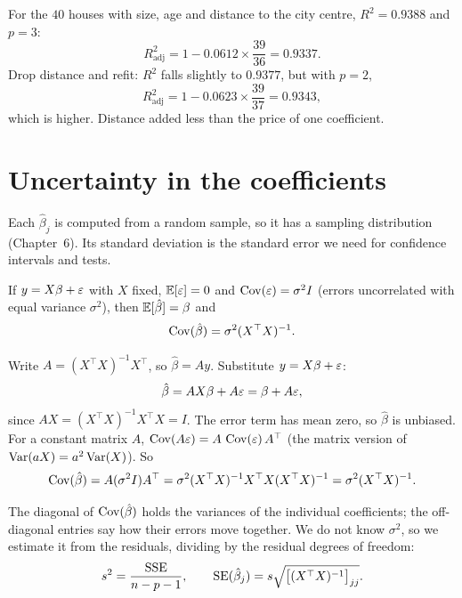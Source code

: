 For the $40$ houses with size, age and distance to the city centre, $R^2 = 0.9388$ and
$p = 3$:
\[
  R^2_{\text{adj}} = 1 - 0.0612\times\frac{39}{36} = 0.9337 .
\]
Drop distance and refit: $R^2$ falls slightly to $0.9377$, but with $p = 2$,
\[
  R^2_{\text{adj}} = 1 - 0.0623\times\frac{39}{37} = 0.9343,
\]
which is higher. Distance added less than the price of one coefficient.

\section{Uncertainty in the coefficients}
\label{sec:mlr-se}

Each $\hat\beta_j$ is computed from a random sample, so it has a sampling distribution
(Chapter~6). Its standard deviation is the standard error we need for confidence
intervals and tests.

\begin{theorem}
If $y = X\beta + \varepsilon$ with $X$ fixed, $\operatorname{\mathbb{E}}[\varepsilon] = 0$ and $\operatorname{Cov}(\varepsilon) = \sigma^2 I$
(errors uncorrelated with equal variance $\sigma^2$), then $\operatorname{\mathbb{E}}[\hat\beta] = \beta$ and
\[
  \operatorname{Cov}(\hat\beta) = \sigma^2 (X^\top X)^{-1}.
\]
\end{theorem}

\begin{whybox}
Write $A = (X^\top X)^{-1}X^\top$, so $\hat\beta = Ay$. Substitute $y = X\beta + \varepsilon$:
\[
  \hat\beta = AX\beta + A\varepsilon = \beta + A\varepsilon,
\]
since $AX = (X^\top X)^{-1}X^\top X = I$. The error term has mean zero, so $\hat\beta$
is unbiased. For a constant matrix $A$, $\operatorname{Cov}(A\varepsilon) = A\,\operatorname{Cov}(\varepsilon)\,A^\top$ (the
matrix version of $\operatorname{Var}(aX) = a^2\operatorname{Var}(X)$). So
\[
  \operatorname{Cov}(\hat\beta) = A(\sigma^2 I)A^\top = \sigma^2 (X^\top X)^{-1}X^\top X (X^\top X)^{-1}
  = \sigma^2 (X^\top X)^{-1}.
\]
\end{whybox}

The diagonal of $\operatorname{Cov}(\hat\beta)$ holds the variances of the individual coefficients;
the off-diagonal entries say how their errors move together. We do not know $\sigma^2$,
so we estimate it from the residuals, dividing by the residual degrees of freedom:
\[
  s^2 = \frac{\text{SSE}}{n - p - 1}, \qquad
  \operatorname{SE}(\hat\beta_j) = s\sqrt{\big[(X^\top X)^{-1}\big]_{jj}} .
\]

